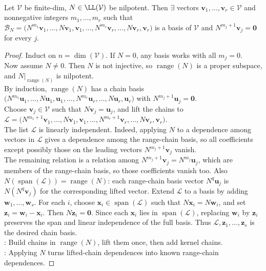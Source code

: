 \begin{theorem} \label{thm:nilpotent-jordan-chain-basis} \\
Let $\mathcal{V}$ be finite-dim, $N\in\LL(\mathcal{V})$ be nilpotent. Then $\exists$ vectors $\mathbf{v}_1,\ldots,\mathbf{v}_r\in\mathcal{V}$ and nonnegative integers $m_1,\ldots,m_r$ such that $\mathcal{B}_N= \bigl(N^{m_1}\mathbf{v}_1,\ldots,N\mathbf{v}_1,\mathbf{v}_1,\ldots, N^{m_r}\mathbf{v}_r,\ldots,N\mathbf{v}_r,\mathbf{v}_r\bigr)$ is a basis of $\mathcal{V}$ and $N^{m_j+1}\mathbf{v}_j=\mathbf{0}$ for every $j$.
\begin{proof}
Induct on $n=\dim(\mathcal{V})$. If $N=0$, any basis works with all $m_j=0$.\\
Now assume $N\neq0$. Then $N$ is not injective, so $\operatorname{range}(N)$ is a proper subspace, and $N|_{\operatorname{range}(N)}$ is nilpotent.\\
By induction, $\operatorname{range}(N)$ has a chain basis $\bigl(N^{m_1}\mathbf{u}_1,\ldots,N\mathbf{u}_1,\mathbf{u}_1,\ldots, N^{m_r}\mathbf{u}_r,\ldots,N\mathbf{u}_r,\mathbf{u}_r\bigr)$ with $N^{m_j+1}\mathbf{u}_j=\mathbf{0}$.\\
Choose $\mathbf{v}_j\in\mathcal{V}$ such that $N\mathbf{v}_j=\mathbf{u}_j$, and lift the chains to $\mathcal{L}= \bigl(N^{m_1+1}\mathbf{v}_1,\ldots,N\mathbf{v}_1,\mathbf{v}_1,\ldots, N^{m_r+1}\mathbf{v}_r,\ldots,N\mathbf{v}_r,\mathbf{v}_r\bigr)$.\\
The list $\mathcal{L}$ is linearly independent. Indeed, applying $N$ to a dependence among vectors in $\mathcal{L}$ gives a dependence among the range-chain basis, so all coefficients except possibly those on the leading vectors $N^{m_j+1}\mathbf{v}_j$ vanish.\\
The remaining relation is a relation among $N^{m_j+1}\mathbf{v}_j=N^{m_j}\mathbf{u}_j$, which are members of the range-chain basis, so those coefficients vanish too. Also $N(\operatorname{span}(\mathcal{L}))=\operatorname{range}(N)$: each range-chain basis vector $N^q\mathbf{u}_j$ is $N(N^q\mathbf{v}_j)$ for the corresponding lifted vector. Extend $\mathcal{L}$ to a basis by adding $\mathbf{w}_1,\ldots,\mathbf{w}_s$. For each $i$, choose $\mathbf{x}_i\in\operatorname{span}(\mathcal{L})$ such that $N\mathbf{x}_i=N\mathbf{w}_i$, and set $\mathbf{z}_i=\mathbf{w}_i-\mathbf{x}_i$. Then $N\mathbf{z}_i=\mathbf{0}$. Since each $\mathbf{x}_i$ lies in $\operatorname{span}(\mathcal{L})$, replacing $\mathbf{w}_i$ by $\mathbf{z}_i$ preserves the span and linear independence of the full basis. Thus $\mathcal{L},\mathbf{z}_1,\ldots,\mathbf{z}_s$ is the desired chain basis.\\
: Build chains in $\operatorname{range}(N)$, lift them once, then add kernel chains.\\
: Applying $N$ turns lifted-chain dependences into known range-chain dependences.
\end{proof}
\end{theorem}

